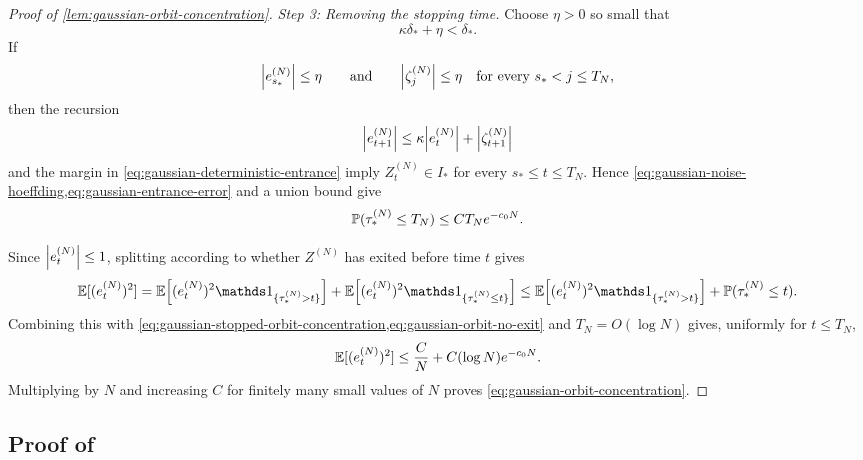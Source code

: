 \documentclass[11pt,reqno,a4paper]{article}
\newcommand{\Pp}{\P}
\newcommand{\Ee}{\E}
\begin{document}
\begin{proof}[Proof of \cref{lem:gaussian-orbit-concentration}]
  \emph{Step 3: Removing the stopping time.}
  Choose $\eta>0$ so small that
  \begin{equation*}
    \kappa\delta_\ast+\eta<\delta_\ast.
  \end{equation*}
  If
  \begin{equation*}
    \abs{e_{s_\ast}^{(N)}}\leq\eta
    \qquad\mbox{and}\qquad
    \abs{\zeta_j^{(N)}}\leq\eta
    \quad\mbox{for every }s_\ast<j\leq T_N,
  \end{equation*}
  then the recursion
  \begin{equation*}
    \abs{e_{t+1}^{(N)}}
    \leq
    \kappa\abs{e_t^{(N)}}+\abs{\zeta_{t+1}^{(N)}}
  \end{equation*}
  and the margin in \cref{eq:gaussian-deterministic-entrance} imply
  $Z_t^{(N)}\in I_\ast$ for every $s_\ast\leq t\leq T_N$. Hence
  \cref{eq:gaussian-noise-hoeffding,eq:gaussian-entrance-error} and a union
  bound give
  \begin{equation*}
    \Pp(\tau_\ast^{(N)}\leq T_N)
    \leq
    C T_N e^{-c_0N}.
  \end{equation*}

  Since $\abs{e_t^{(N)}}\leq1$, splitting according to whether $Z^{(N)}$ has
  exited before time $t$ gives
  \begin{equation*}
    \Ee[(e_t^{(N)})^2]
    =
    \Ee\left[
      (e_t^{(N)})^2\one_{\{\tau_\ast^{(N)}>t\}}
    \right]
    +
    \Ee\left[
      (e_t^{(N)})^2\one_{\{\tau_\ast^{(N)}\leq t\}}
    \right]
    \leq
    \Ee\left[
      (e_t^{(N)})^2\one_{\{\tau_\ast^{(N)}>t\}}
    \right]
    +
    \Pp(\tau_\ast^{(N)}\leq t).
  \end{equation*}
  Combining this with
  \cref{eq:gaussian-stopped-orbit-concentration,eq:gaussian-orbit-no-exit} and
  $T_N=O(\log N)$ gives, uniformly for $t\leq T_N$,
  \begin{equation*}
    \Ee[(e_t^{(N)})^2]
    \leq
    \frac{C}{N}
    +
    C(\log N)e^{-c_0N}.
  \end{equation*}
  Multiplying by $N$ and increasing $C$ for finitely many small values of $N$
  proves \cref{eq:gaussian-orbit-concentration}.
\end{proof}

\subsection{Proof of
\texorpdfstring{}
{Lemma~\ref{lem:gaussian-synchronous-cutoff-scale}}}
\label{app:supercritical-cutoff-contraction}
\end{document}
